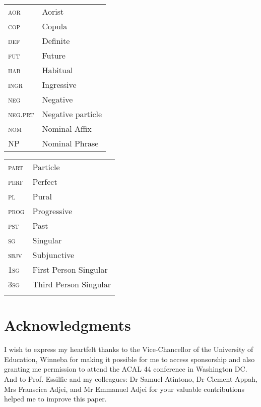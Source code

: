 \documentclass[output=paper
,newtxmath
,modfonts
,nonflat]{langsci/langscibook}
\begin{document}
\begin{tabularx}{.45\textwidth}{lQ}
\textsc{aor} & Aorist \\
\textsc{cop} & Copula\\
 \textsc{def}&  Definite\\
 \textsc{fut}&  Future\\
 \textsc{hab}&  Habitual\\
\textsc{ingr}&  Ingressive\\
\textsc{neg}&  Negative \\
\textsc{neg.prt} &  Negative particle\\
 \textsc{nom} & Nominal Affix\\
 NP &  Nominal Phrase\\
\end{tabularx}
\begin{tabularx}{.45\textwidth}{lQ}
 \textsc{part} & Particle\\
 \textsc{perf}&  Perfect\\
 \textsc{pl}&  Pural\\
 \textsc{prog}&  Progressive\\
 \textsc{pst} & Past\\
 \textsc{sg} & Singular\\
 \textsc{sbjv} & Subjunctive\\
 1\textsc{sg}&  First Person Singular\\
 3\textsc{sg}&  Third Person Singular\\
 \\
 
\end{tabularx}


\section*{Acknowledgments}
I wish to express my heartfelt thanks to the Vice-Chancellor of the University of Education, Winneba for making it possible for me to access sponsorship and also granting me permission to attend the ACAL 44 conference in Washington DC. And to Prof. Essilfie and my colleagues: Dr Samuel Atintono, Dr Clement Appah, Mrs Franscica Adjei, and Mr Emmanuel Adjei for your valuable contributions helped me to improve this paper.
 

\sloppy
\printbibliography[heading=subbibliography,notkeyword=this]
\end{document}
